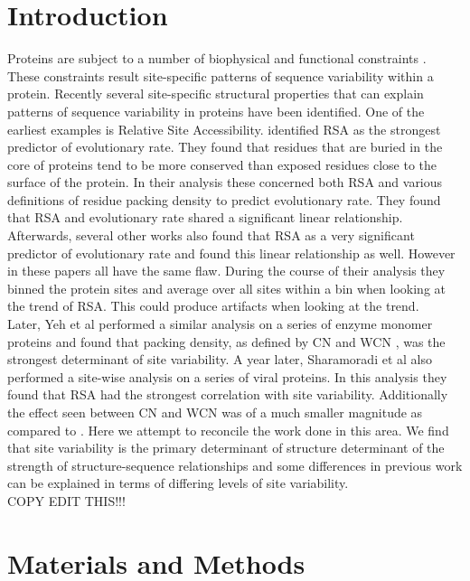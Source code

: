 \documentclass[12pt]{article}
\begin{document}
\section{Introduction}
\label{sec:intro}

Proteins are subject to a number of biophysical and functional constraints \citep{Scherreretal2012, Wilkeetal2010}. These constraints result site-specific patterns of sequence variability within a protein. Recently several site-specific structural properties that can explain patterns of sequence variability in proteins have been identified. One of the earliest examples is Relative Site Accessibility. \cite{Fransozaetal2009} identified RSA as the strongest predictor of evolutionary rate. They found that residues that are buried in the core of proteins tend to be more conserved than exposed residues close to the surface of the protein. In their analysis these concerned both RSA and various definitions of residue packing density to predict evolutionary rate. They found that RSA and evolutionary rate shared a significant linear relationship. Afterwards, several other works \citep{Ramseyetal2011, Scherreretal2012} also found that RSA as a very significant predictor of evolutionary rate and found this linear relationship as well. However in these papers all have the same flaw. During the course of their analysis they binned the protein sites and average over all sites within a bin when looking at the trend of RSA. This could produce artifacts when looking at the trend. \\
\indent Later, Yeh et al performed a similar analysis on a series of enzyme monomer proteins and found that packing density, as defined by CN and WCN \citep{Liaoetal2005, Yehetal2014, Huangetal2014}, was the strongest determinant of site variability. A year later, Sharamoradi et al also performed a site-wise analysis on a series of viral proteins. In this analysis they found that RSA had the strongest correlation with site variability. Additionally the effect seen between CN and WCN was of a much smaller magnitude as compared to \citep{Yehetal2014}. Here we attempt to reconcile the work done in this area. We find that site variability is the primary determinant of structure determinant of the strength of structure-sequence relationships and some differences in previous work can be explained in terms of differing levels of site variability. \\
COPY EDIT THIS!!! \\


\section{Materials and Methods}
\label{sec:mam}
\end{document}
